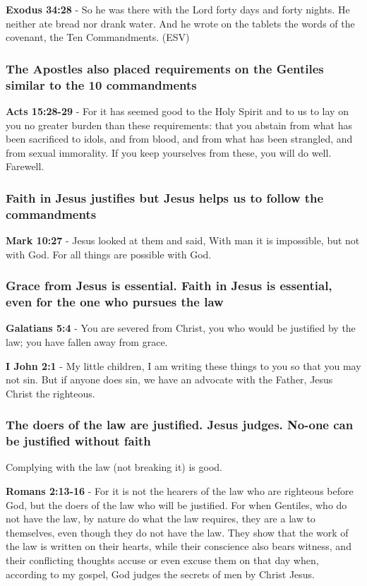\documentclass[11pt]{article}
\begin{document}
\textbf{Exodus 34:28} - So he was there with the Lord forty days and forty nights. He neither ate bread nor drank water. And he wrote on the tablets the words of the covenant, the Ten Commandments. (ESV)

\subsubsection{The Apostles also placed requirements on the Gentiles similar to the 10 commandments}
\label{sec:orgcfc8a54}
\textbf{Acts 15:28-29} - For it has seemed good to the Holy Spirit and to us to lay on you no greater burden than these requirements: that you abstain from what has been sacrificed to idols, and from blood, and from what has been strangled, and from sexual immorality. If you keep yourselves from these, you will do well. Farewell.

\subsubsection{Faith in Jesus justifies but Jesus helps us to follow the commandments}
\label{sec:org24f8932}
\textbf{Mark 10:27} - Jesus looked at them and said, With man it is impossible, but not with God. For all things are possible with God.

\subsubsection{Grace from Jesus is essential. Faith in Jesus is essential, even for the one who pursues the law}
\label{sec:orgdefa413}
\textbf{Galatians 5:4} - You are severed from Christ, you who would be justified by the law; you have fallen away from grace.

\textbf{I John 2:1} - My little children, I am writing these things to you so that you may not sin. But if anyone does sin, we have an advocate with the Father, Jesus Christ the righteous.

\subsubsection{The doers of the law are justified. Jesus judges. No-one can be justified without faith}
\label{sec:orgee8efe6}
Complying with the law (not breaking it) is good.

\textbf{Romans 2:13-16} - For it is not the hearers of the law who are righteous before God, but the doers of the law who will be justified.  For when Gentiles, who do not have the law, by nature do what the law requires, they are a law to themselves, even though they do not have the law.  They show that the work of the law is written on their hearts, while their conscience also bears witness, and their conflicting thoughts accuse or even excuse them on that day when, according to my gospel, God judges the secrets of men by Christ Jesus.
\end{document}
